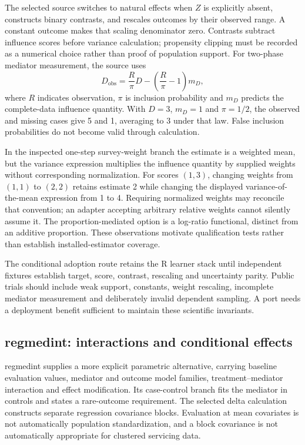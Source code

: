 The selected source switches to natural effects when $Z$ is explicitly absent,
constructs binary contrasts, and rescales outcomes by their observed range.
A constant outcome makes that scaling denominator zero. Contrasts subtract
influence scores before variance calculation; propensity clipping must be
recorded as a numerical choice rather than proof of population support. For
two-phase mediator measurement, the source uses
\[
 D_{\mathrm{obs}}=\frac{R}{\pi}D
                 -\left(\frac{R}{\pi}-1\right)m_D,
\]
where $R$ indicates observation, $\pi$ is inclusion probability and $m_D$
predicts the complete-data influence quantity. With $D=3$, $m_D=1$ and
$\pi=1/2$, the observed and missing cases give 5 and 1, averaging to 3 under
that law. False inclusion probabilities do not become valid through calculation.
\citep{exec25_rmed_medoutcon,exec25_rmed_choice}

In the inspected one-step survey-weight branch the estimate is a weighted
mean, but the variance expression multiplies the influence quantity by supplied
weights without corresponding normalization. For scores $(1,3)$, changing
weights from $(1,1)$ to $(2,2)$ retains estimate 2 while changing the displayed
variance-of-the-mean expression from 1 to 4. Requiring normalized weights may
reconcile that convention; an adapter accepting arbitrary relative weights
cannot silently assume it. The proportion-mediated option is a log-ratio
functional, distinct from an additive proportion. These observations motivate
qualification tests rather than establish installed-estimator coverage.
\citep{exec25_rmed_medoutcon,exec25_rmed_choice}

The conditional adoption route retains the R learner stack until independent
fixtures establish target, score, contrast, rescaling and uncertainty parity.
Public trials should include weak support, constants, weight rescaling,
incomplete mediator measurement and deliberately invalid dependent sampling.
A port needs a deployment benefit sufficient to maintain these scientific
invariants. \citep{exec25_rmed_choice}

\subsection{regmedint: interactions and conditional effects}

regmedint supplies a more explicit parametric alternative, carrying baseline
evaluation values, mediator and outcome model families, treatment--mediator
interaction and effect modification. Its case-control branch fits the mediator
in controls and states a rare-outcome requirement. The selected delta
calculation constructs separate regression covariance blocks. Evaluation at
mean covariates is not automatically population standardization, and a block
covariance is not automatically appropriate for clustered servicing data.
\citep{exec25_rmed_regmedint}

